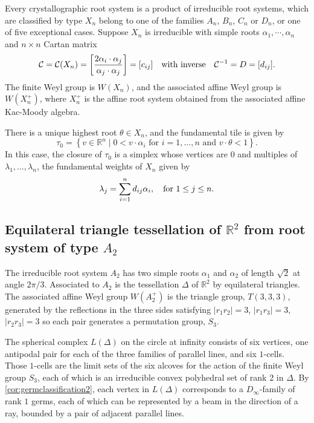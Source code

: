 \documentclass[11pt]{amsart}
\def\R{\mathbb{R}}
\def\a{\alpha}
\def\lam{\lambda}            \def\Lam{\Lambda}
\def\cC{\mathcal C}
\numberwithin{table}{section}
\numberwithin{figure}{section}
\theoremstyle{remark}
\providecommand{\set}[1]{\left\lbrace#1\right\rbrace}
\newcommand\suchthat{ \mathrel{}\middle| \mathrel{}}
\renewcommand{\bold}[1]{\medskip \noindent {\bf #1 }\nopagebreak}
\begin{document}
\bold{Irreducible root systems.} Every crystallographic root system is
a product of irreducible root systems, which are classified by type
$X_n$ belong to one of the families $A_n$, $B_n$, $C_n$ or $D_n$, or
one of five exceptional cases. Suppose $X_n$ is irreducible with
simple roots $\a_1, \cdots, \a_n$ and $n\times n$ Cartan matrix
$$\cC = \cC(X_n) = \left[ \frac{2\a_i\cdot\a_j}{\a_j\cdot\a_j} \right]
= [c_{ij}]\quad\hbox{with inverse}\quad \cC^{-1} = D = [d_{ij}].$$
The finite Weyl group is $W(X_n)$, and the associated affine Weyl
group is $W(X_n^+)$, where $X_n^+$ is the affine root system obtained
from the associated affine Kac-Moody algebra.

There is a unique highest root $\theta \in X_n$, and the fundamental
tile is given by
\[
  \tau_0 = \set{v\in \R^n \suchthat 0< v\cdot \alpha_i \text{ for }
    i=1,\dotsc,n \text{ and } v\cdot \theta < 1}.
\]
In this case, the closure of $\tau_0$ is a simplex whose vertices are
$0$ and multiples of $\lambda_1,\dotsc, \lambda_n$, the fundamental
weights of $X_n$ given by
$$\lam_j = \sum_{i=1}^n d_{ij} \a_i, \quad\hbox{for  } 1\leq j\leq
n.$$


\subsection{Equilateral triangle tessellation of $\R^2$ from root system of type $A_2$}

The irreducible root system $A_2$ has two simple roots $\alpha_1$ and
$\alpha_2$ of length $\sqrt{2}$ at angle $2\pi/3$.  Associated to
$A_2$ is the tessellation $\Delta$ of $\R^2$ by equilateral triangles.
The associated affine Weyl group $W(A_2^+)$ is the triangle group,
$T(3,3,3)$, generated by the reflections in the three sides satisfying
$|r_1 r_2| = 3$, $|r_1 r_3| = 3$, $|r_2 r_3| = 3 $ so each pair
generates a permutation group, $S_3$.

The spherical complex $L(\Delta)$ on the circle at infinity consists of six
vertices, one antipodal pair for each of the three families of
parallel lines, and six $1$-cells. Those $1$-cells are the limit sets
of the six alcoves for the action of the finite Weyl group $S_3$, each
of which is an irreducible convex polyhedral set of rank $2$ in
$\Delta$. By \cref{cor:germclassification2}, each vertex in $L(\Delta)$
corresponds to a $D_\infty$-family of rank $1$ germs, each of which
can be represented by a beam in the direction of a ray, bounded by a
pair of adjacent parallel lines.
\end{document}
